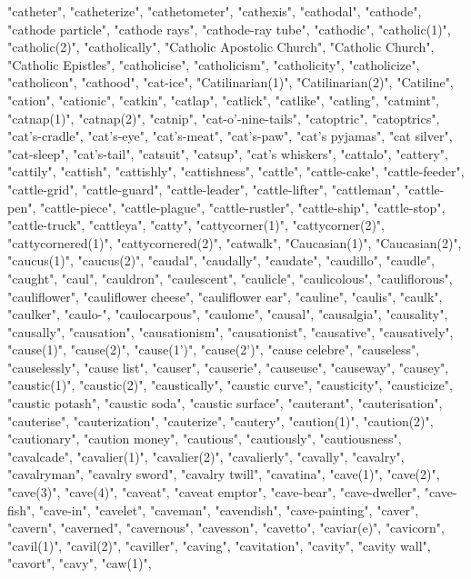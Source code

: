 "catheter",
"catheterize",
"cathetometer",
"cathexis",
"cathodal",
"cathode",
"cathode particle",
"cathode rays",
"cathode-ray tube",
"cathodic",
"catholic(1)",
"catholic(2)",
"catholically",
"Catholic Apostolic Church",
"Catholic Church",
"Catholic Epistles",
"catholicise",
"catholicism",
"catholicity",
"catholicize",
"catholicon",
"cathood",
"cat-ice",
"Catilinarian(1)",
"Catilinarian(2)",
"Catiline",
"cation",
"cationic",
"catkin",
"catlap",
"catlick",
"catlike",
"catling",
"catmint",
"catnap(1)",
"catnap(2)",
"catnip",
"cat-o'-nine-tails",
"catoptric",
"catoptrics",
"cat's-cradle",
"cat's-eye",
"cat's-meat",
"cat's-paw",
"cat's pyjamas",
"cat silver",
"cat-sleep",
"cat's-tail",
"catsuit",
"catsup",
"cat's whiskers",
"cattalo",
"cattery",
"cattily",
"cattish",
"cattishly",
"cattishness",
"cattle",
"cattle-cake",
"cattle-feeder",
"cattle-grid",
"cattle-guard",
"cattle-leader",
"cattle-lifter",
"cattleman",
"cattle-pen",
"cattle-piece",
"cattle-plague",
"cattle-rustler",
"cattle-ship",
"cattle-stop",
"cattle-truck",
"cattleya",
"catty",
"cattycorner(1)",
"cattycorner(2)",
"cattycornered(1)",
"cattycornered(2)",
"catwalk",
"Caucasian(1)",
"Caucasian(2)",
"caucus(1)",
"caucus(2)",
"caudal",
"caudally",
"caudate",
"caudillo",
"caudle",
"caught",
"caul",
"cauldron",
"caulescent",
"caulicle",
"caulicolous",
"cauliflorous",
"cauliflower",
"cauliflower cheese",
"cauliflower ear",
"cauline",
"caulis",
"caulk",
"caulker",
"caulo-",
"caulocarpous",
"caulome",
"causal",
"causalgia",
"causality",
"causally",
"causation",
"causationism",
"causationist",
"causative",
"causatively",
"cause(1)",
"cause(2)",
"cause(1')",
"cause(2')",
"cause celebre",
"causeless",
"causelessly",
"cause list",
"causer",
"causerie",
"causeuse",
"causeway",
"causey",
"caustic(1)",
"caustic(2)",
"caustically",
"caustic curve",
"causticity",
"causticize",
"caustic potash",
"caustic soda",
"caustic surface",
"cauterant",
"cauterisation",
"cauterise",
"cauterization",
"cauterize",
"cautery",
"caution(1)",
"caution(2)",
"cautionary",
"caution money",
"cautious",
"cautiously",
"cautiousness",
"cavalcade",
"cavalier(1)",
"cavalier(2)",
"cavalierly",
"cavally",
"cavalry",
"cavalryman",
"cavalry sword",
"cavalry twill",
"cavatina",
"cave(1)",
"cave(2)",
"cave(3)",
"cave(4)",
"caveat",
"caveat emptor",
"cave-bear",
"cave-dweller",
"cave-fish",
"cave-in",
"cavelet",
"caveman",
"cavendish",
"cave-painting",
"caver",
"cavern",
"caverned",
"cavernous",
"cavesson",
"cavetto",
"caviar(e)",
"cavicorn",
"cavil(1)",
"cavil(2)",
"caviller",
"caving",
"cavitation",
"cavity",
"cavity wall",
"cavort",
"cavy",
"caw(1)",
